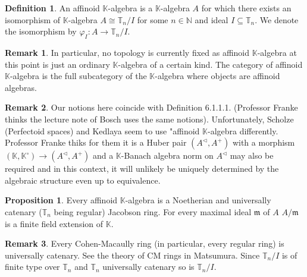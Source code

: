 \documentclass[10pt]{article}
\numberwithin{equation}{section}
\theoremstyle{definition}
\newtheorem{proposition}{Proposition}[subsection]
\newtheorem{definition}{Definition}[subsection]
\newtheorem{remark}{Remark}[subsection]
\newcommand{\N}[0]{\mathbb{N}}
\newcommand{\m}[0]{\mathfrak{m}}
\newcommand{\T}[0]{\mathbb{T}}
\newcommand{\K}[0]{\mathbb{K}}
\begin{document}
\begin{definition}
    \label{definition_31_3}
    An affinoid $\K$-algebra is a $\K$-algebra $A$ for which there exists an isomorphism of $\K$-algebra $A\cong \T_n/I$ for some $n\in\N$ and ideal $I\subseteq\T_n$. We denote the isomorphism by $\varphi_I:A\to \T_n/I$.
\end{definition}
\begin{remark}
    In particular, no topology is currently fixed as affinoid $\K$-algebra at this point is just an ordinary $\K$-algebra of a certain kind.
    The category of affinoid $\K$-algebra is the full subcategory of the $\K$-algebra where objects are affinoid algebras.
\end{remark}

\begin{remark}
    Our notions here coincide with \cite{BGR} Definition 6.1.1.1. (Professor Franke thinks the lecture note of Bosch uses the same notions). Unfortunately, Scholze (Perfectoid spaces) and Kedlaya seem to use "affinoid $\K$-algebra differently. Professor Franke thiks for them it is a Huber pair $(A^\triangleleft,A^+)$ with a morphism $(\K,\K^\circ)\to (A^\triangleleft,A^+)$ and a $\K$-Banach algebra norm on $A^\triangleleft$ may also be required and in this context, it will unlikely be uniquely determined by the algebraic structure even up to equivalence.
\end{remark}

\begin{proposition}
    \label{fact_31_9}
    Every affinoid $\K$-algebra is a Noetherian and universally catenary ($\T_n$ being regular) Jacobson ring. For every maximal ideal $\m$ of $A$ $A/\m$ is a finite field extension of $\K$.
\end{proposition}

\begin{remark}
    Every Cohen-Macaully ring (in particular, every regular ring) is universally catenary. See the theory of CM rings in Matsumura. Since $\T_n/I$ is of finite type over $\T_n$ and $\T_n$ universally catenary so is $\T_n/I$. 
\end{remark}
\end{document}
